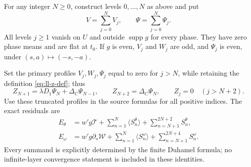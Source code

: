 \begin{proposition}
\label{prop:ll-finite}
For any integer $N\geq0$, construct levels $0,\ldots,N$ as above
and put
\[
V=\sum_{j=0}^NV_j,\qquad \Psi=\sum_{j=0}^N\Psi_j.
\]
All levels $j\geq1$ vanish on $U$ and outside $\operatorname{supp}g$
for every phase. They have zero phase means and are flat at $t_0$.
If $g$ is even, $V_j$ and $W_j$ are odd, and $\Psi_j$ is even,
under $(s,a)\mapsto(-s,-a)$.

Set the primary profiles $V_j,W_j,\Psi_j$ equal to zero for $j>N$,
while retaining the definition \eqref{eq:ll-z-def}; thus
\[
Z_{N+1}=\lambda D_1\Psi_N+\Delta_C\Psi_{N-1},\qquad
Z_{N+2}=\Delta_C\Psi_N,\qquad Z_j=0\quad(j>N+2).
\]
Use these truncated profiles in the source formulas for all positive
indices. The exact residuals are
\begin{align}
E_\theta&=w'g\mathcal T
 +\sum_{n=1}^N\langle S_n^\theta\rangle
 +\sum_{n=N+1}^{2N+2}S_n^\theta,
\label{eq:ll-finite-scalar}\\
E_\omega&=w'g\partial_s\mathcal W
 +\sum_{n=1}^N\langle S_n^\omega\rangle
 +\sum_{n=N+1}^{2N+4}S_n^\omega.
\label{eq:ll-finite-vorticity}
\end{align}
Every summand is explicitly determined by the finite Duhamel formula;
no infinite-layer convergence statement is included in these identities.
\end{proposition}

